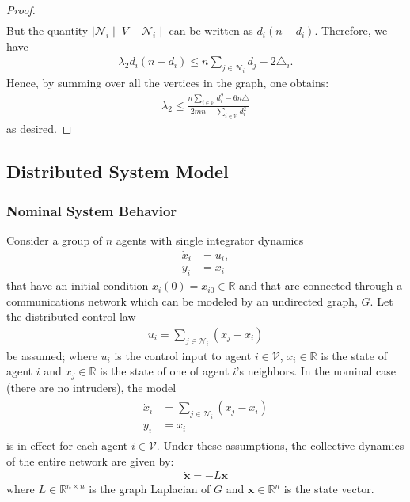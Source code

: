 \documentclass{amsart}
\theoremstyle{definition}
\theoremstyle{remark}
\numberwithin{equation}{section}
\def\cN{\mathcal{N}}
\def\cV{\mathcal{V}}
\begin{document}
\begin{proof}
\begin{align*}
\end{align*}
But the quantity $\mid \cN_i \mid \mid V - \cN_i \mid$ can be written as $d_i (n-d_i)$. Therefore, we have
\begin{align*}
\lambda_2 d_i (n-d_i) \leq n\displaystyle\sum_{j \in \cN_i} d_j - 2\triangle_i.
\end{align*}
Hence, by summing over all the vertices in the graph, one obtains:
\begin{align*}
\lambda_2 \leq \frac{n \displaystyle\sum_{i \in \cV}d_i^2 - 6n\triangle}{2mn - \displaystyle\sum_{i \in \cV} d_i^2}
\end{align*}
as desired. 
\end{proof}
\subsection{Distributed System Model}
\subsubsection{Nominal System Behavior} Consider a group of $n$ agents with single integrator dynamics 
\begin{align*}
\dot{x}_i &= u_i, \\
y_i &= x_i 
\end{align*}
that have an initial condition $x_i (0) = x_{i0} \in \mathbb{R}$ and that are connected through a communications network which can be modeled by an undirected graph, $G$. Let the distributed control law
\begin{align*} 
\displaystyle u_i = \sum_{j \in \mathcal{N}_i} (x_j - x_i)
\end{align*}
be assumed; where $u_i$ is the control input to agent $i \in \mathcal{V}$, $x_i \in \mathbb{R}$ is the state of agent $i$ and $x_j \in \mathbb{R}$ is the state of one of agent $i$'s neighbors. In the nominal case (there are no intruders), the model 
\begin{gather} 
\begin{aligned} \label{eq:agentCons}
\dot{x}_i &= \sum_{j \in \mathcal{N}_i} (x_j - x_i) \\
y_i &= x_i
\end{aligned}
\end{gather}
is in effect for each agent $i \in \mathcal{V}$. Under these assumptions, the collective dynamics of the entire network are given by:
\begin{align} \label{eq:consensysDyn}
\dot{\mathbf{x}} = -L\mathbf{x}
\end{align}
where $L \in \mathbb{R}^{n \times n}$ is the graph Laplacian of $G$ and $\mathbf{x} \in \mathbb{R}^n$ is the state vector. 
\end{document}
